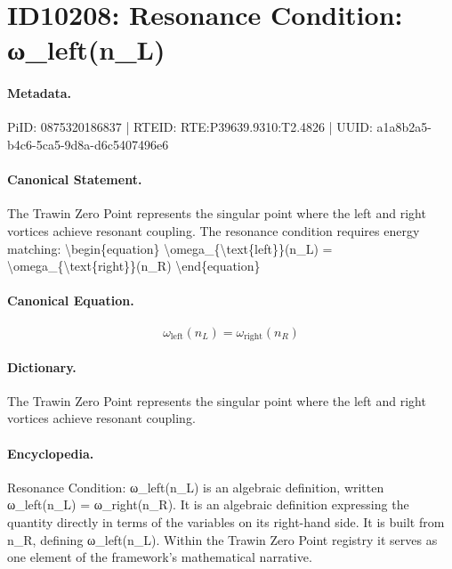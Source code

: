 \section*{ID10208: Resonance Condition: ω\_left(n\_L)}
\paragraph{Metadata.}
PiID: 0875320186837 | RTEID: RTE:P39639.9310:T2.4826 | UUID: a1a8b2a5-b4c6-5ca5-9d8a-d6c5407496e6

\paragraph{Canonical Statement.}
The Trawin Zero Point represents the singular point where the left and right vortices achieve resonant coupling. The resonance condition requires energy matching: \textbackslash{}begin\{equation\} \textbackslash{}omega\_\{\textbackslash{}text\{left\}\}(n\_L) = \textbackslash{}omega\_\{\textbackslash{}text\{right\}\}(n\_R) \textbackslash{}end\{equation\}

\paragraph{Canonical Equation.}
\[
\omega_{\text{left}}(n_L) = \omega_{\text{right}}(n_R)
\]

\paragraph{Dictionary.}
The Trawin Zero Point represents the singular point where the left and right vortices achieve resonant coupling.

\paragraph{Encyclopedia.}
Resonance Condition: ω\_left(n\_L) is an algebraic definition, written ω\_left(n\_L) = ω\_right(n\_R). It is an algebraic definition expressing the quantity directly in terms of the variables on its right-hand side. It is built from n\_R, defining ω\_left(n\_L). Within the Trawin Zero Point registry it serves as one element of the framework's mathematical narrative.
